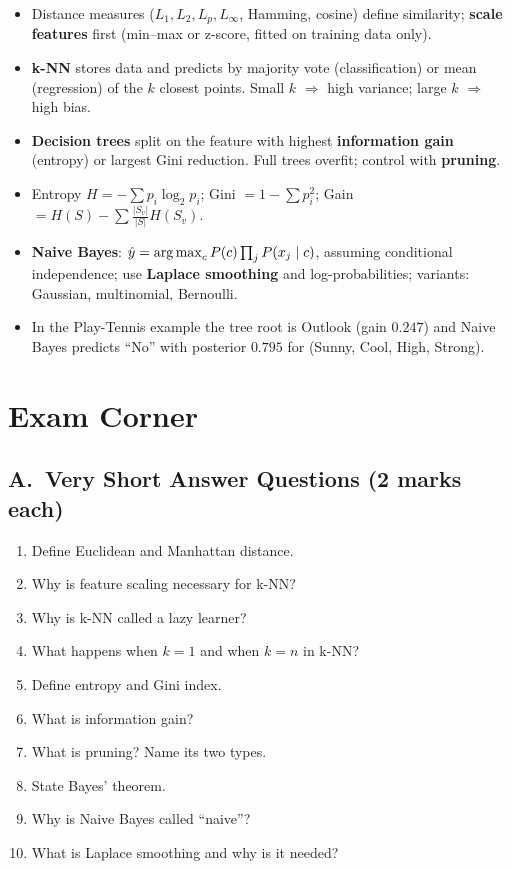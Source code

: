 \begin{summary}
\begin{itemize}
  \item Distance measures ($L_1,L_2,L_p,L_\infty$, Hamming, cosine) define similarity; \textbf{scale features} first (min--max or z-score, fitted on training data only).
  \item \textbf{k-NN} stores data and predicts by majority vote (classification) or mean (regression) of the $k$ closest points. Small $k$ $\Rightarrow$ high variance; large $k$ $\Rightarrow$ high bias.
  \item \textbf{Decision trees} split on the feature with highest \textbf{information gain} (entropy) or largest Gini reduction. Full trees overfit; control with \textbf{pruning}.
  \item Entropy $H=-\sum p_i\log_2p_i$; Gini $=1-\sum p_i^2$; Gain $=H(S)-\sum\frac{|S_v|}{|S|}H(S_v)$.
  \item \textbf{Naive Bayes}: $\hat y=\operatorname*{arg\,max}_c P(c)\prod_jP(x_j\mid c)$, assuming conditional independence; use \textbf{Laplace smoothing} and log-probabilities; variants: Gaussian, multinomial, Bernoulli.
  \item In the Play-Tennis example the tree root is Outlook (gain $0.247$) and Naive Bayes predicts ``No'' with posterior $0.795$ for (Sunny, Cool, High, Strong).
\end{itemize}
\end{summary}

\section*{Exam Corner}

\subsection*{A.\ Very Short Answer Questions (2 marks each)}
\begin{enumerate}
  \item Define Euclidean and Manhattan distance. 
  \item Why is feature scaling necessary for k-NN? 
  \item Why is k-NN called a lazy learner? 
  \item What happens when $k=1$ and when $k=n$ in k-NN? 
  \item Define entropy and Gini index. 
  \item What is information gain? 
  \item What is pruning? Name its two types. 
  \item State Bayes' theorem. 
  \item Why is Naive Bayes called ``naive''? 
  \item What is Laplace smoothing and why is it needed? 
\end{enumerate}

